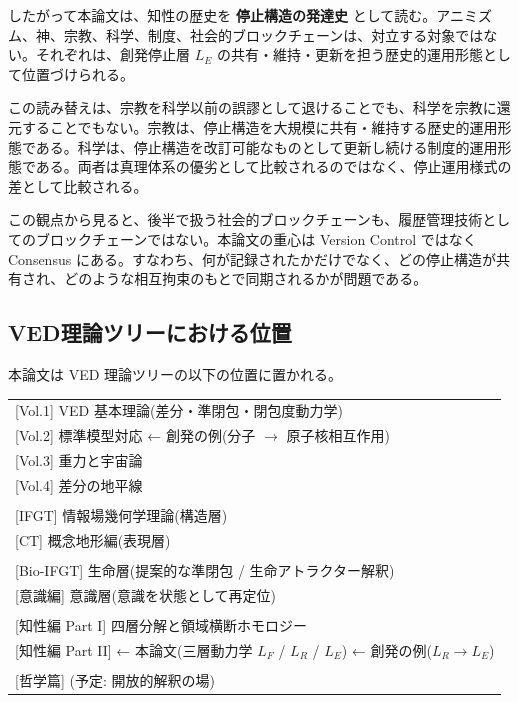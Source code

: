 したがって本論文は、知性の歴史を \textbf{停止構造の発達史} として読む。アニミズム、神、宗教、科学、制度、社会的ブロックチェーンは、対立する対象ではない。それぞれは、創発停止層 $L_E$ の共有・維持・更新を担う歴史的運用形態として位置づけられる。

この読み替えは、宗教を科学以前の誤謬として退けることでも、科学を宗教に還元することでもない。宗教は、停止構造を大規模に共有・維持する歴史的運用形態である。科学は、停止構造を改訂可能なものとして更新し続ける制度的運用形態である。両者は真理体系の優劣として比較されるのではなく、停止運用様式の差として比較される。

この観点から見ると、後半で扱う社会的ブロックチェーンも、履歴管理技術としてのブロックチェーンではない。本論文の重心は Version Control ではなく Consensus にある。すなわち、何が記録されたかだけでなく、どの停止構造が共有され、どのような相互拘束のもとで同期されるかが問題である。

\bigskip


\subsection{VED理論ツリーにおける位置}


本論文は VED 理論ツリーの以下の位置に置かれる。

\begin{center}
\begin{tabular}{@{}l@{}}
{}[Vol.1] VED 基本理論(差分・準閉包・閉包度動力学) \\
{}[Vol.2] 標準模型対応 ← 創発の例(分子 $\to$ 原子核相互作用) \\
{}[Vol.3] 重力と宇宙論 \\
{}[Vol.4] 差分の地平線 \\
\\
{}[IFGT] 情報場幾何学理論(構造層) \\
{}[CT] 概念地形編(表現層) \\
\\
{}[Bio-IFGT] 生命層(提案的な準閉包 / 生命アトラクター解釈) \\
{}[意識編] 意識層(意識を状態として再定位) \\
\\
{}[知性編 Part I] 四層分解と領域横断ホモロジー \\
{}[知性編 Part II] ← 本論文(三層動力学 $L_F$ / $L_R$ / $L_E$) ← 創発の例($L_R \to L_E$) \\
\\
{}[哲学篇] (予定: 開放的解釈の場)
\end{tabular}
\end{center}


